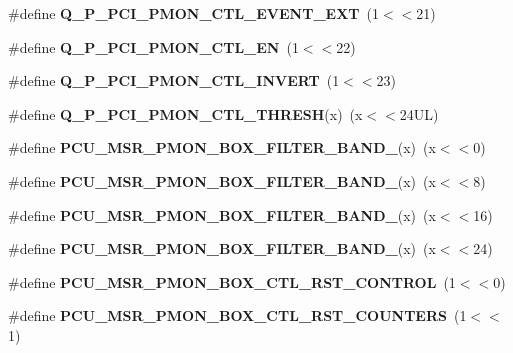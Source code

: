 \begin{DoxyCompactItemize}
\item 
\#define {\bfseries Q\+\_\+\+P\+\_\+\+P\+C\+I\+\_\+\+P\+M\+O\+N\+\_\+\+C\+T\+L\+\_\+\+E\+V\+E\+N\+T\+\_\+\+E\+XT}~(1$<$$<$21)\label{types_8h_a6f393387567839622066d15c749ae1d5}

\item 
\#define {\bfseries Q\+\_\+\+P\+\_\+\+P\+C\+I\+\_\+\+P\+M\+O\+N\+\_\+\+C\+T\+L\+\_\+\+EN}~(1$<$$<$22)\label{types_8h_ab0ea8d2d83fd6ac529248e1374dbdf3c}

\item 
\#define {\bfseries Q\+\_\+\+P\+\_\+\+P\+C\+I\+\_\+\+P\+M\+O\+N\+\_\+\+C\+T\+L\+\_\+\+I\+N\+V\+E\+RT}~(1$<$$<$23)\label{types_8h_abdb99ce46d65242a12d5b9d7320be907}

\item 
\#define {\bfseries Q\+\_\+\+P\+\_\+\+P\+C\+I\+\_\+\+P\+M\+O\+N\+\_\+\+C\+T\+L\+\_\+\+T\+H\+R\+E\+SH}(x)~(x$<$$<$24\+U\+L)\label{types_8h_a519775439b97120154571709922c5129}

\item 
\#define {\bfseries P\+C\+U\+\_\+\+M\+S\+R\+\_\+\+P\+M\+O\+N\+\_\+\+B\+O\+X\+\_\+\+F\+I\+L\+T\+E\+R\+\_\+\+B\+A\+N\+D\+\_}(x)~(x$<$$<$0)\label{types_8h_ad803a7d37decfd980f61c179c5b1a3cd}

\item 
\#define {\bfseries P\+C\+U\+\_\+\+M\+S\+R\+\_\+\+P\+M\+O\+N\+\_\+\+B\+O\+X\+\_\+\+F\+I\+L\+T\+E\+R\+\_\+\+B\+A\+N\+D\+\_}(x)~(x$<$$<$8)\label{types_8h_ac03367f3dad1f3ead4d9ad72d399247d}

\item 
\#define {\bfseries P\+C\+U\+\_\+\+M\+S\+R\+\_\+\+P\+M\+O\+N\+\_\+\+B\+O\+X\+\_\+\+F\+I\+L\+T\+E\+R\+\_\+\+B\+A\+N\+D\+\_}(x)~(x$<$$<$16)\label{types_8h_aace8b49d5adbd42496512163acec16a1}

\item 
\#define {\bfseries P\+C\+U\+\_\+\+M\+S\+R\+\_\+\+P\+M\+O\+N\+\_\+\+B\+O\+X\+\_\+\+F\+I\+L\+T\+E\+R\+\_\+\+B\+A\+N\+D\+\_}(x)~(x$<$$<$24)\label{types_8h_a658de4ac1d9ff7e867cb1a8f2234a30b}

\item 
\#define {\bfseries P\+C\+U\+\_\+\+M\+S\+R\+\_\+\+P\+M\+O\+N\+\_\+\+B\+O\+X\+\_\+\+C\+T\+L\+\_\+\+R\+S\+T\+\_\+\+C\+O\+N\+T\+R\+OL}~(1$<$$<$0)\label{types_8h_ae9f193e896a597c5cf2068ed6c876d53}

\item 
\#define {\bfseries P\+C\+U\+\_\+\+M\+S\+R\+\_\+\+P\+M\+O\+N\+\_\+\+B\+O\+X\+\_\+\+C\+T\+L\+\_\+\+R\+S\+T\+\_\+\+C\+O\+U\+N\+T\+E\+RS}~(1$<$$<$1)\label{types_8h_a049ae39c73f052e90d9550b6f70ebe61}


\end{DoxyCompactItemize}
